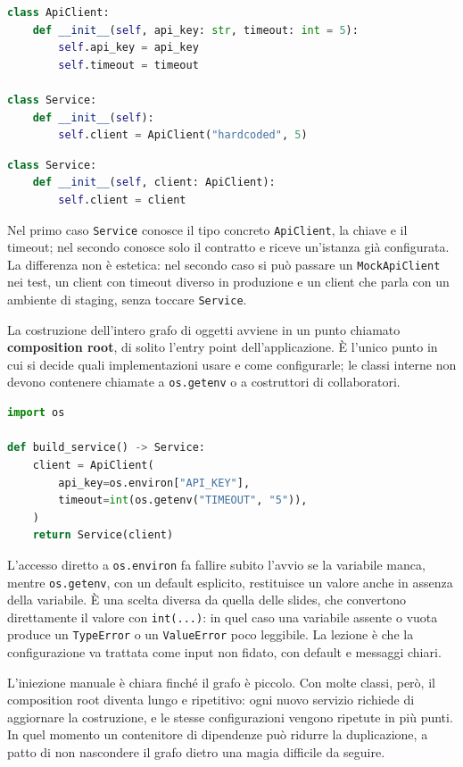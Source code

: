 \documentclass[12pt]{extarticle}
\begin{document}
\begin{lstlisting}[language=Python]
class ApiClient:
    def __init__(self, api_key: str, timeout: int = 5):
        self.api_key = api_key
        self.timeout = timeout

class Service:
    def __init__(self):
        self.client = ApiClient("hardcoded", 5)
\end{lstlisting}

\begin{lstlisting}[language=Python]
class Service:
    def __init__(self, client: ApiClient):
        self.client = client
\end{lstlisting}

\noindent Nel primo caso \texttt{Service} conosce il tipo concreto \texttt{ApiClient}, la chiave e il timeout; nel secondo conosce solo il contratto e riceve un'istanza già configurata. La differenza non è estetica: nel secondo caso si può passare un \texttt{MockApiClient} nei test, un client con timeout diverso in produzione e un client che parla con un ambiente di staging, senza toccare \texttt{Service}.

\noindent La costruzione dell'intero grafo di oggetti avviene in un punto chiamato \textbf{composition root}, di solito l'entry point dell'applicazione. È l'unico punto in cui si decide quali implementazioni usare e come configurarle; le classi interne non devono contenere chiamate a \texttt{os.getenv} o a costruttori di collaboratori.

\begin{lstlisting}[language=Python]
import os

def build_service() -> Service:
    client = ApiClient(
        api_key=os.environ["API_KEY"],
        timeout=int(os.getenv("TIMEOUT", "5")),
    )
    return Service(client)
\end{lstlisting}

\noindent L'accesso diretto a \texttt{os.environ} fa fallire subito l'avvio se la variabile manca, mentre \texttt{os.getenv}, con un default esplicito, restituisce un valore anche in assenza della variabile. È una scelta diversa da quella delle slides, che convertono direttamente il valore con \texttt{int(...)}: in quel caso una variabile assente o vuota produce un \texttt{TypeError} o un \texttt{ValueError} poco leggibile. La lezione è che la configurazione va trattata come input non fidato, con default e messaggi chiari.

\noindent L'iniezione manuale è chiara finché il grafo è piccolo. Con molte classi, però, il composition root diventa lungo e ripetitivo: ogni nuovo servizio richiede di aggiornare la costruzione, e le stesse configurazioni vengono ripetute in più punti. In quel momento un contenitore di dipendenze può ridurre la duplicazione, a patto di non nascondere il grafo dietro una magia difficile da seguire.
\end{document}
